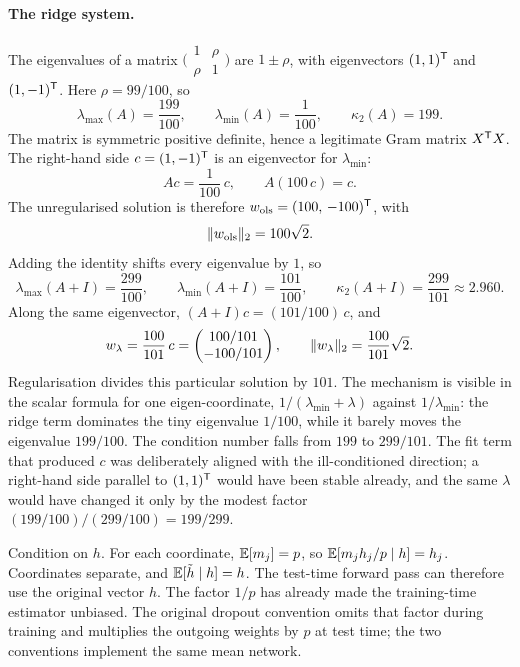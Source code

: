 \paragraph{The ridge system.}
The eigenvalues of a matrix \(\bigl(\begin{smallmatrix} 1 & \rho\\ \rho & 1\end{smallmatrix}\bigr)\) are \(1\pm\rho\), with eigenvectors \((1,1)^{\mathsf{T}}\) and \((1,-1)^{\mathsf{T}}\). Here \(\rho=99/100\), so
\[
  \lambda_{\max}(A) = \frac{199}{100},
  \qquad
  \lambda_{\min}(A) = \frac{1}{100},
  \qquad
  \kappa_2(A) = 199.
\]
The matrix is symmetric positive definite, hence a legitimate Gram matrix \(X^{\mathsf{T}} X\). The right-hand side \(c=(1,-1)^{\mathsf{T}}\) is an eigenvector for \(\lambda_{\min}\):
\[
  A c = \frac{1}{100}\, c,
  \qquad
  A(100\, c) = c.
\]
The unregularised solution is therefore \(w_{\mathrm{ols}} = (100,\,-100)^{\mathsf{T}}\), with
\[
  \lVert w_{\mathrm{ols}}\rVert_2 = 100\sqrt{2}.
\]
Adding the identity shifts every eigenvalue by \(1\), so
\[
  \lambda_{\max}(A+I) = \frac{299}{100},
  \qquad
  \lambda_{\min}(A+I) = \frac{101}{100},
  \qquad
  \kappa_2(A+I) = \frac{299}{101} \approx 2.960.
\]
Along the same eigenvector, \((A+I)c = (101/100)\, c\), and
\[
  w_{\lambda}
  =
  \frac{100}{101}\, c
  =
  \begin{pmatrix} 100/101 \\ -100/101 \end{pmatrix},
  \qquad
  \lVert w_{\lambda}\rVert_2 = \frac{100}{101}\sqrt{2}.
\]
Regularisation divides this particular solution by \(101\). The mechanism is visible in the scalar formula for one eigen-coordinate, \(1/(\lambda_{\min}+\lambda)\) against \(1/\lambda_{\min}\): the ridge term dominates the tiny eigenvalue \(1/100\), while it barely moves the eigenvalue \(199/100\). The condition number falls from \(199\) to \(299/101\). The fit term that produced \(c\) was deliberately aligned with the ill-conditioned direction; a right-hand side parallel to \((1,1)^{\mathsf{T}}\) would have been stable already, and the same \(\lambda\) would have changed it only by the modest factor \((199/100)/(299/100)=199/299\).


Condition on \(h\). For each coordinate, \(\mathbb{E}[m_j]=p\), so \(\mathbb{E}[m_j h_j/p \mid h] = h_j\). Coordinates separate, and \(\mathbb{E}[\tilde h\mid h]=h\). The test-time forward pass can therefore use the original vector \(h\). The factor \(1/p\) has already made the training-time estimator unbiased. The original dropout convention omits that factor during training and multiplies the outgoing weights by \(p\) at test time; the two conventions implement the same mean network.

